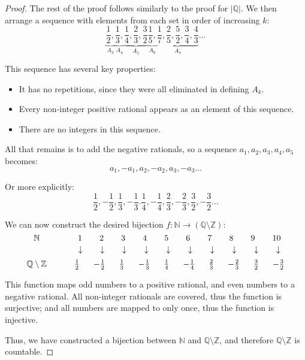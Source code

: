 \documentclass[12pt, a4paper]{article}
\newcommand{\Q}{\mathbb{Q}}
\newcommand{\Z}{\mathbb{Z}}
\newcommand{\N}{\mathbb{N}}
\begin{document}
\begin{proof}
    The rest of the proof follows similarly to the proof for $|\Q|$. We then arrange a sequence
    with elements from each set in order of increasing $k$:
    \[
        \underbrace{\frac{1}{2},}_{A_3}
        \underbrace{\frac{1}{3},}_{A_4}
        \underbrace{\frac{1}{4}, \frac{2}{3}, \frac{3}{2}}_{A_5}
        \underbrace{\frac{1}{5},}_{A_6}
        \underbrace{\frac{1}{7}, \frac{2}{5}, \frac{5}{2}, \frac{3}{4}, \frac{4}{3}}_{A_7}
        \ldots
    \]

    This sequence has several key properties:

    \begin{itemize}
        \item It has no repetitions, since they were all eliminated in defining $A_k$.
        \item Every non-integer positive rational appears as an element of this sequence.
        \item There are no integers in this sequence.
    \end{itemize}

    \newpage

    All that remains is to add the negative rationals, so a sequence
    $a_1, a_2, a_3, a_4, a_5$ becomes:
    \[
        a_1, -a_1, a_2, -a_2, a_3, -a_3 \ldots
    \]

    Or more explicitly:
    \[
        \frac{1}{2}, -\frac{1}{2},
        \frac{1}{3}, -\frac{1}{3}.
        \frac{1}{4}, -\frac{1}{4}, \frac{2}{3}, -\frac{2}{3},
        \frac{3}{2}, -\frac{3}{2} \ldots
    \]

    We can now construct the desired bijection $f \colon \N \to (\Q \setminus \Z)$:
    \[
        \makebox[2cm][c]{$\N$}\makebox[10cm][s]{
            1 2 3 4 5 6 7 8 9 10
        }
    \]
    \[
        \makebox[2cm][l]{}\makebox[10cm][s]{
            \mbox{$\downarrow$}
            \mbox{$\downarrow$}
            \mbox{$\downarrow$}
            \mbox{$\downarrow$}
            \mbox{$\downarrow$}
            \mbox{$\downarrow$}
            \mbox{$\downarrow$}
            \mbox{$\downarrow$}
            \mbox{$\downarrow$}
            \mbox{$\downarrow$}
        }
    \]
    \[
        \makebox[2cm][c]{$\Q \setminus \Z$}\makebox[10cm][s]{
            $\frac{1}{2}$ $-\frac{1}{2}$
            $\frac{1}{3}$ $-\frac{1}{3}$
            $\frac{1}{4}$ $-\frac{1}{4}$
            $\frac{2}{3}$ $-\frac{2}{3}$
            $\frac{3}{2}$ $-\frac{3}{2}$
        }
    \]


    This function maps odd numbers to a positive rational, and even numbers to a
    negative rational. All non-integer rationals are covered, thus the function is
    surjective; and all numbers are mapped to only once, thus the function is injective.

    Thus, we have constructed a bijection between $\N$ and $\Q \setminus \Z$, and therefore
    $\Q \setminus \Z$ is countable.

\end{proof}
\end{document}
